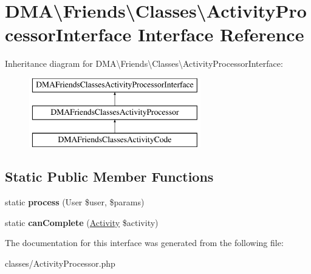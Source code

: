 \hypertarget{interfaceDMA_1_1Friends_1_1Classes_1_1ActivityProcessorInterface}{\section{D\-M\-A\textbackslash{}Friends\textbackslash{}Classes\textbackslash{}Activity\-Processor\-Interface Interface Reference}
\label{interfaceDMA_1_1Friends_1_1Classes_1_1ActivityProcessorInterface}
}
Inheritance diagram for D\-M\-A\textbackslash{}Friends\textbackslash{}Classes\textbackslash{}Activity\-Processor\-Interface\-:\begin{figure}[H]
\begin{center}
\leavevmode
\includegraphics[height=3.000000cm]{d5/de2/interfaceDMA_1_1Friends_1_1Classes_1_1ActivityProcessorInterface}
\end{center}
\end{figure}
\subsection*{Static Public Member Functions}
\begin{DoxyCompactItemize}
\item 
\hypertarget{interfaceDMA_1_1Friends_1_1Classes_1_1ActivityProcessorInterface_a409b8e2e66125557cdd1adcceb26318e}{static {\bfseries process} (User \$user, \$params)}\label{interfaceDMA_1_1Friends_1_1Classes_1_1ActivityProcessorInterface_a409b8e2e66125557cdd1adcceb26318e}

\item 
\hypertarget{interfaceDMA_1_1Friends_1_1Classes_1_1ActivityProcessorInterface_a554030462c01bd8facec5e24c0d2d5bf}{static {\bfseries can\-Complete} (\hyperlink{classDMA_1_1Friends_1_1Models_1_1Activity}{Activity} \$activity)}\label{interfaceDMA_1_1Friends_1_1Classes_1_1ActivityProcessorInterface_a554030462c01bd8facec5e24c0d2d5bf}

\end{DoxyCompactItemize}


The documentation for this interface was generated from the following file\-:\begin{DoxyCompactItemize}
\item 
classes/Activity\-Processor.\-php\end{DoxyCompactItemize}
